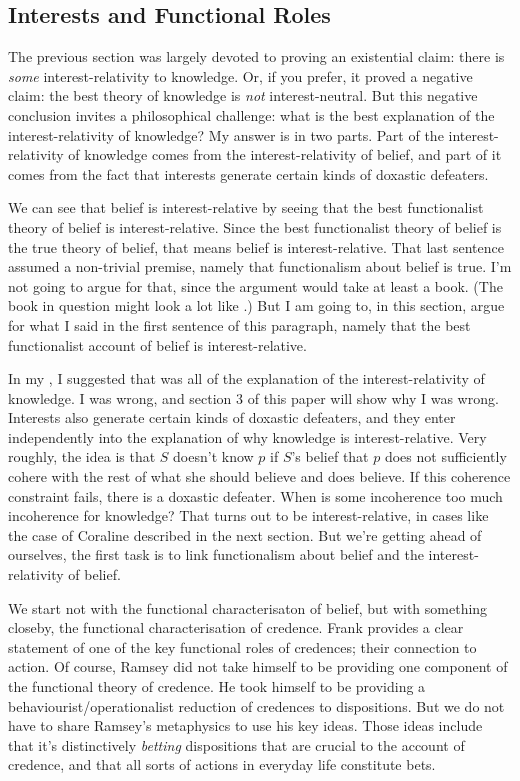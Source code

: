\subsection{Interests and Functional Roles}
The previous section was largely devoted to proving an existential claim: there is \textit{some} interest-relativity to knowledge. Or, if you prefer, it proved a negative claim: the best theory of knowledge is \textit{not} interest-neutral. But this negative conclusion invites a philosophical challenge: what is the best explanation of the interest-relativity of knowledge? My answer is in two parts. Part of the interest-relativity of knowledge comes from the interest-relativity of belief, and part of it comes from the fact that interests generate certain kinds of doxastic defeaters.

We can see that belief is interest-relative by seeing that the best functionalist theory of belief is interest-relative. Since the best functionalist theory of belief is the true theory of belief, that means belief is interest-relative. That last sentence assumed a non-trivial premise, namely that functionalism about belief is true. I'm not going to argue for that, since the argument would take at least a book. (The book in question might look a lot like \cite{DBMJackson2007}.) But I am going to, in this section, argue for what I said in the first sentence of this paragraph, namely that the best functionalist account of belief is interest-relative.

In my \citeyearpar{Weatherson2005-WEACWD}, I suggested that was all of the explanation of the interest-relativity of knowledge. I was wrong, and section 3 of this paper will show why I was wrong. Interests also generate certain kinds of doxastic defeaters, and they enter independently into the explanation of why knowledge is interest-relative. Very roughly, the idea is that $S$ doesn't know $p$ if $S$'s belief that $p$ does not sufficiently cohere with the rest of what she should believe and does believe. If this coherence constraint fails, there is a doxastic defeater. When is some incoherence too much incoherence for knowledge? That turns out to be interest-relative, in cases like the case of Coraline described in the next section. But we're getting ahead of ourselves, the first task is to link functionalism about belief and the interest-relativity of belief.

We start not with the functional characterisaton of belief, but with something closeby, the functional characterisation of credence. Frank \cite{RamseyTruthProb} provides a clear statement of one of the key functional roles of credences; their connection to action. Of course, Ramsey did not take himself to be providing one component of the functional theory of credence. He took himself to be providing a behaviourist/operationalist reduction of credences to dispositions. But we do not have to share Ramsey's metaphysics to use his key ideas. Those ideas include that it's distinctively \textit{betting} dispositions that are crucial to the account of credence, and that all sorts of actions in everyday life constitute bets.

